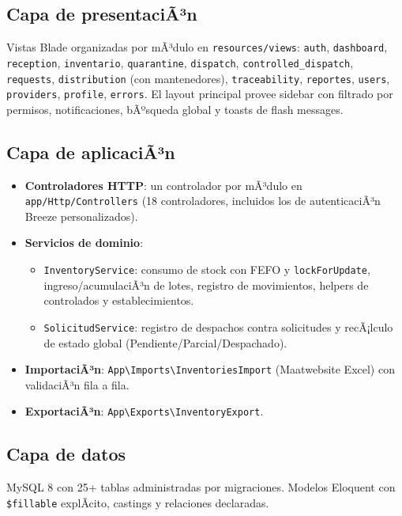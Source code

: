 ﻿\documentclass[a4paper, 12pt]{article}
\begin{document}
\subsection{Capa de presentaciÃ³n}
Vistas Blade organizadas por mÃ³dulo en \texttt{resources/views}: \texttt{auth}, \texttt{dashboard}, \texttt{reception}, \texttt{inventario}, \texttt{quarantine}, \texttt{dispatch}, \texttt{controlled\_dispatch}, \texttt{requests}, \texttt{distribution} (con mantenedores), \texttt{traceability}, \texttt{reportes}, \texttt{users}, \texttt{providers}, \texttt{profile}, \texttt{errors}. El layout principal provee sidebar con filtrado por permisos, notificaciones, bÃºsqueda global y toasts de flash messages.

\subsection{Capa de aplicaciÃ³n}
\begin{itemize}
    \item \textbf{Controladores HTTP}: un controlador por mÃ³dulo en \texttt{app/Http/Controllers} (18 controladores, incluidos los de autenticaciÃ³n Breeze personalizados).
    \item \textbf{Servicios de dominio}:
    \begin{itemize}
        \item \texttt{InventoryService}: consumo de stock con FEFO y \texttt{lockForUpdate}, ingreso/acumulaciÃ³n de lotes, registro de movimientos, helpers de controlados y establecimientos.
        \item \texttt{SolicitudService}: registro de despachos contra solicitudes y recÃ¡lculo de estado global (Pendiente/Parcial/Despachado).
    \end{itemize}
    \item \textbf{ImportaciÃ³n}: \texttt{App\textbackslash Imports\textbackslash InventoriesImport} (Maatwebsite Excel) con validaciÃ³n fila a fila.
    \item \textbf{ExportaciÃ³n}: \texttt{App\textbackslash Exports\textbackslash InventoryExport}.
\end{itemize}

\subsection{Capa de datos}
MySQL 8 con 25+ tablas administradas por migraciones. Modelos Eloquent con \texttt{\$fillable} explÃ­cito, castings y relaciones declaradas.
\end{document}
